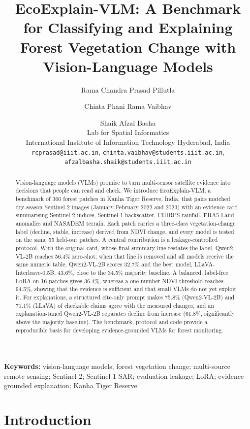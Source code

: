 \documentclass[11pt]{article}
\title{EcoExplain-VLM: A Benchmark for Classifying and
Explaining Forest Vegetation Change with Vision-Language Models}
\author{
  Rama Chandra Prasad Pillutla \and Chinta Phani Rama Vaibhav \and Shaik Afzal Basha \\
  {\normalsize\mdseries Lab for Spatial Informatics} \\
  {\normalsize\mdseries International Institute of Information Technology Hyderabad, India} \\
  {\normalsize\mdseries\texttt{rcprasad@iiit.ac.in}, \texttt{chinta.vaibhav@students.iiit.ac.in},} \\
  {\normalsize\mdseries\texttt{afzalbasha.shaik@students.iiit.ac.in}}
}
\begin{document}
\maketitle


\begin{abstract}
Vision-language models (VLMs) promise to turn multi-sensor satellite
evidence into decisions that people can read and check. We introduce
EcoExplain-VLM, a benchmark of 366 forest patches in Kanha Tiger
Reserve, India, that pairs matched dry-season Sentinel-2 images
(January-February 2022 and 2023) with an evidence card summarising
Sentinel-2 indices, Sentinel-1 backscatter, CHIRPS rainfall, ERA5-Land
anomalies and NASADEM terrain. Each patch carries a three-class
vegetation-change label (decline, stable, increase) derived from NDVI
change, and every model is tested on the same 55 held-out patches. A
central contribution is a leakage-controlled protocol. With the original
card, whose final summary line restates the label, Qwen2-VL-2B reaches
56.4\% zero-shot; when that line is removed and all models receive the
same numeric table, Qwen2-VL-2B scores 32.7\% and the best model,
LLaVA-Interleave-0.5B, 43.6\%, close to the 34.5\% majority baseline. A
balanced, label-free LoRA on 16 patches gives 36.4\%, whereas a
one-number NDVI threshold reaches 94.5\%, showing that the evidence is
sufficient and that small VLMs do not yet exploit it. For explanations,
a structured cite-only prompt makes 75.8\% (Qwen2-VL-2B) and 71.1\%
(LLaVA) of checkable claims agree with the measured changes, and an
explanation-tuned Qwen2-VL-2B separates decline from increase (61.8\%,
significantly above the majority baseline). The benchmark, protocol and
code provide a reproducible basis for developing evidence-grounded VLMs
for forest monitoring.
\end{abstract}

\noindent\textbf{Keywords:} vision-language models; forest vegetation
change; multi-source remote sensing; Sentinel-2; Sentinel-1 SAR;
evaluation leakage; LoRA; evidence-grounded explanation; Kanha Tiger
Reserve


\section{Introduction}
\end{document}
